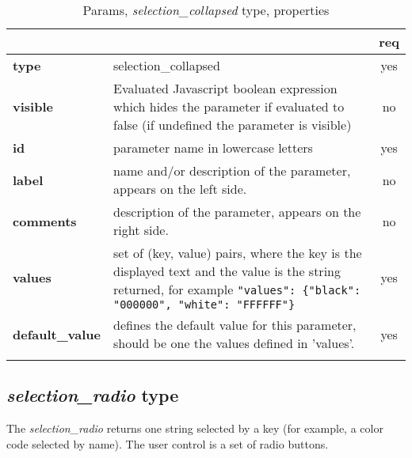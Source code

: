 \begin{longtable}{|>{\bf}L{\linewidth}|L{\linewidth}|c|}
\hline
      &  & {\bf req} 
\tabularnewline \hline \hline
 type  & selection\_collapsed    & yes \\ \hline
 visible  & Evaluated Javascript boolean expression which hides the parameter if
            evaluated to false (if undefined the parameter is visible)& no \\ \hline
 id     & parameter name in lowercase letters & yes \\ \hline
 label  & name and/or description of the parameter, appears on the left side. & no
                      \\ \hline
 comments & description of the parameter, appears on the right side. & no
                      \\ \hline
 values & set of (key, value) pairs, where the key is the displayed text and the 
value is the string returned, for example \texttt{"values": \{"black": "000000", "white": "FFFFFF"\}} & yes
                      \\ \hline
 default\_value & defines the default value for this parameter, should be one 
the values defined in 'values'. & yes \\ \hline
\caption{Params, \emph{selection\_collapsed} type, properties}
\end{longtable}

\subsection{ \emph{selection\_radio} type}

The \emph{selection\_radio} returns one string selected by a key (for example, 
a color code selected by name). The user control is a set of radio buttons.

